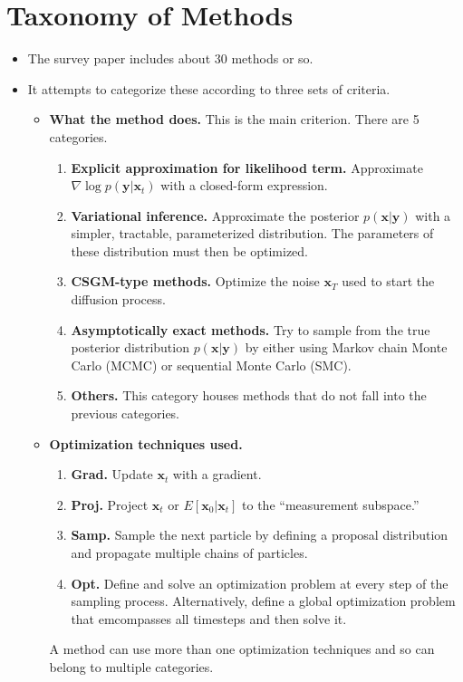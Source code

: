 \documentclass[10pt]{article}
\newcommand{\ve}[1]{\mathbf{#1}}
\begin{document}
\section{Taxonomy of Methods}

\begin{itemize}
  \item The survey paper includes about 30 methods or so.
  
  \item It attempts to categorize these according to three sets of criteria.
  \begin{itemize}
    \item {\bf What the method does.} This is the main criterion. There are 5 categories.
    \begin{enumerate}
      \item {\bf Explicit approximation for likelihood term.} Approximate $\nabla \log p(\ve{y}|\ve{x}_t)$ with a closed-form expression.
      \item {\bf Variational inference.} Approximate the posterior $p(\ve{x}|\ve{y})$ with a simpler, tractable, parameterized distribution. The parameters of these distribution must then be optimized.
      \item {\bf CSGM-type methods.} Optimize the noise $\ve{x}_T$ used to start the diffusion process.
      \item {\bf Asymptotically exact methods.} Try to sample from the true posterior distribution $p(\ve{x}|\ve{y})$ by either using Markov chain Monte Carlo (MCMC) or sequential Monte Carlo (SMC).
      \item {\bf Others.} This category houses methods that do not fall into the previous categories.
    \end{enumerate}

    \item {\bf Optimization techniques used.}
    \begin{enumerate}
      \item {\bf Grad.} Update $\ve{x}_t$ with a gradient.
      \item {\bf Proj.} Project $\ve{x}_t$ or $E[\ve{x}_0|\ve{x}_t]$ to the ``measurement subspace.''
      \item {\bf Samp.} Sample the next particle by defining a proposal distribution and propagate multiple chains of particles.
      \item {\bf Opt.} Define and solve an optimization problem at every step of the sampling process. Alternatively, define a global optimization problem that emcompasses all timesteps and then solve it.
    \end{enumerate}
    A method can use more than one optimization techniques and so can belong to multiple categories.


\end{itemize}
\end{itemize}
\end{document}
